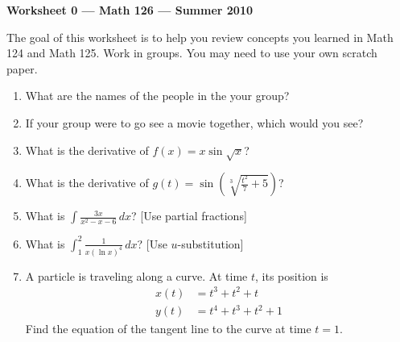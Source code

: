 \documentclass[12pt]{article}
\begin{document}
\thispagestyle{empty}
\begin{center}
{\bf Worksheet 0 --- Math 126 --- Summer 2010}
\end{center}
\noindent
The goal of this worksheet is to help you review concepts you learned in Math 124 and Math 125. Work in groups. You may need to use your own scratch paper.

\begin{enumerate}
\item What are the names of the people in the your group?
\vfill

\item If your group were to go see a movie together, which would you see?
\vfill
\item What is the derivative of $f(x)=x\sin\sqrt x$?
\vfill
\item What is the derivative of $\displaystyle g(t)=\sin\left(\sqrt[3]{\frac{t^2}{7}+5}\right)$?
\vfill
\item What is $\displaystyle \int \frac{3x}{x^2-x-6}\,dx$? [Use partial fractions]
\vfill
\item What is $\displaystyle \int_1^2 \frac{1}{x(\ln x)^4}\, dx$? [Use $u$-substitution]
\vfill
\item A particle is traveling along a curve. At time $t$, its position is
\begin{align*}
x(t)&=t^3+t^2+t\\
y(t)&=t^4+t^3+t^2+1
\end{align*}
Find the equation of the tangent line to the curve at time $t=1$. 

\end{enumerate}


 
\end{document}
